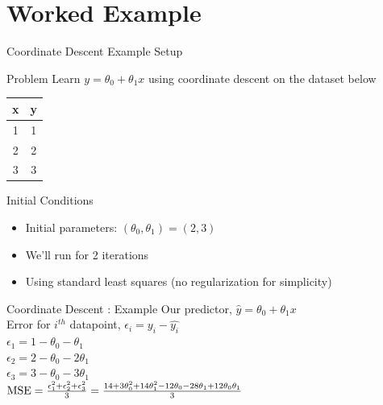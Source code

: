 \documentclass{beamer}
\begin{document}
\section{Worked Example}

\begin{frame}{Coordinate Descent Example Setup}
\begin{examplebox}{Problem}
Learn $y = \theta_0 + \theta_1 x$ using coordinate descent on the dataset below
\end{examplebox}

\begin{table}[]
\centering
\label{tab:my-table}
\begin{tabular}{|c|c|}
\hline
\textbf{x} & \textbf{y} \\ \hline
1 & 1 \\ \hline
2 & 2 \\ \hline
3 & 3 \\ \hline
\end{tabular}
\end{table}

\begin{codebox}{Initial Conditions}
\begin{itemize}
\item Initial parameters: $(\theta_0, \theta_1) = (2,3)$
\item We'll run for 2 iterations
\item Using standard least squares (no regularization for simplicity)
\end{itemize}
\end{codebox}
\end{frame}



\begin{frame}{Coordinate Descent : Example}
Our predictor, $\hat{y} = \theta_0 + \theta_1x$\\
\vspace{1cm}
Error for $i^{th}$ datapoint, $\epsilon_i = y_i - \hat{y_i}$\\
$\epsilon_1 = 1 - \theta_0 - \theta_1$ \\
$\epsilon_2 = 2 - \theta_0 - 2\theta_1$ \\
$\epsilon_3 = 3 - \theta_0 - 3\theta_1$ \\

\vspace{1cm}
$\operatorname{MSE} = \frac{\epsilon_1^2 + \epsilon_2^2 + \epsilon_3^2}{3} = \frac{14 + 3\theta_0^2 + 14\theta_1^2 -12\theta_0 - 28\theta_1 + 12\theta_0\theta_1}{3}$\\
\end{frame}
\end{document}

